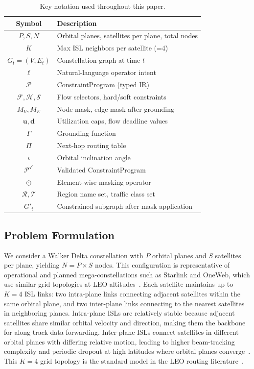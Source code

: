 \documentclass[10pt, conference, letterpaper]{IEEEtran}
\begin{document}
\begin{table}[t]
\centering
\caption{Key notation used throughout this paper.}
\label{tab:notation}
\small
\begin{tabular}{cl}
\toprule
\textbf{Symbol} & \textbf{Description} \\
\midrule
$P, S, N$ & Orbital planes, satellites per plane, total nodes \\
$K$ & Max ISL neighbors per satellite (=4) \\
$G_t = (V, E_t)$ & Constellation graph at time $t$ \\
$\ell$ & Natural-language operator intent \\
$\mathcal{P}$ & ConstraintProgram (typed IR) \\
$\mathcal{F}, \mathcal{H}, \mathcal{S}$ & Flow selectors, hard/soft constraints \\
$M_V, M_E$ & Node mask, edge mask after grounding \\
$\mathbf{u}, \mathbf{d}$ & Utilization caps, flow deadline values \\
$\Gamma$ & Grounding function \\
$\Pi$ & Next-hop routing table \\
$\iota$ & Orbital inclination angle \\
$\mathcal{P}^{\checkmark}$ & Validated ConstraintProgram \\
$\odot$ & Element-wise masking operator \\
$\mathcal{R}, \mathcal{T}$ & Region name set, traffic class set \\
$G'_t$ & Constrained subgraph after mask application \\
\bottomrule
\end{tabular}
\end{table}



\subsection{Problem Formulation}
\label{sec:formulation}

We consider a Walker Delta constellation with $P$ orbital planes and
$S$ satellites per plane, yielding $N = P \times S$ nodes. This
configuration is representative of operational and planned
mega-constellations such as Starlink and OneWeb, which use similar
grid topologies at LEO altitudes~\cite{leo_constellation_survey}.
Each satellite maintains up to $K=4$ ISL links: two intra-plane links
connecting adjacent satellites within the same orbital plane, and two
inter-plane links connecting to the nearest satellites in neighboring
planes. Intra-plane ISLs are relatively stable because adjacent
satellites share similar orbital velocity and direction, making them
the backbone for along-track data forwarding. Inter-plane ISLs
connect satellites in different orbital planes with differing relative
motion, leading to higher beam-tracking complexity and periodic
dropout at high latitudes where orbital planes
converge~\cite{isl_dynamics}. This $K=4$ grid topology is the
standard model in the LEO routing
literature~\cite{snapshot_routing,drl_leo1}.
\end{document}
